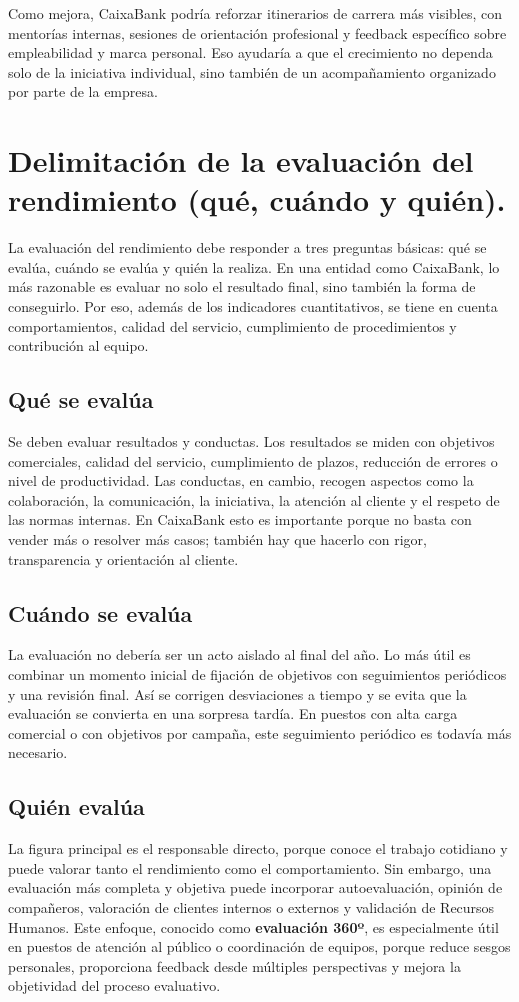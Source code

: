 Como mejora, CaixaBank podría reforzar itinerarios de carrera más visibles, con mentorías internas, sesiones de orientación profesional y feedback específico sobre empleabilidad y marca personal. Eso ayudaría a que el crecimiento no dependa solo de la iniciativa individual, sino también de un acompañamiento organizado por parte de la empresa.

\section{Delimitación de la evaluación del rendimiento (qué, cuándo y quién).}

La evaluación del rendimiento debe responder a tres preguntas básicas: qué se evalúa, cuándo se evalúa y quién la realiza. En una entidad como CaixaBank, lo más razonable es evaluar no solo el resultado final, sino también la forma de conseguirlo. Por eso, además de los indicadores cuantitativos, se tiene en cuenta comportamientos, calidad del servicio, cumplimiento de procedimientos y contribución al equipo.

\subsection*{Qué se evalúa}
Se deben evaluar resultados y conductas. Los resultados se miden con objetivos comerciales, calidad del servicio, cumplimiento de plazos, reducción de errores o nivel de productividad. Las conductas, en cambio, recogen aspectos como la colaboración, la comunicación, la iniciativa, la atención al cliente y el respeto de las normas internas. En CaixaBank esto es importante porque no basta con vender más o resolver más casos; también hay que hacerlo con rigor, transparencia y orientación al cliente.

\subsection*{Cuándo se evalúa}
La evaluación no debería ser un acto aislado al final del año. Lo más útil es combinar un momento inicial de fijación de objetivos con seguimientos periódicos y una revisión final. Así se corrigen desviaciones a tiempo y se evita que la evaluación se convierta en una sorpresa tardía. En puestos con alta carga comercial o con objetivos por campaña, este seguimiento periódico es todavía más necesario.

\subsection*{Quién evalúa}
La figura principal es el responsable directo, porque conoce el trabajo cotidiano y puede valorar tanto el rendimiento como el comportamiento. Sin embargo, una evaluación más completa y objetiva puede incorporar autoevaluación, opinión de compañeros, valoración de clientes internos o externos y validación de Recursos Humanos. Este enfoque, conocido como \textbf{evaluación 360º}, es especialmente útil en puestos de atención al público o coordinación de equipos, porque reduce sesgos personales, proporciona feedback desde múltiples perspectivas y mejora la objetividad del proceso evaluativo.

